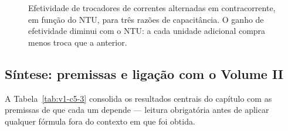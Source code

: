 \documentclass[12pt,a4paper]{article}
\numberwithin{equation}{section}
\numberwithin{table}{section}
\numberwithin{figure}{section}
\begin{document}
\begin{figure}[H]
\centering
{}
\caption[Efetividade de trocadores contracorrente em função do NTU.]{%
Efetividade de trocadores de correntes alternadas em contracorrente, em
função do NTU, para três razões de capacitância. O ganho de efetividade
diminui com o NTU: a cada unidade adicional compra menos troca que a
anterior.}
\label{fig:v1-c5-3}
\end{figure}

\subsection{Síntese: premissas e ligação com o Volume II}\label{sub:v1-c5-sintese}

A Tabela~\ref{tab:v1-c5-3} consolida os resultados centrais do capítulo com
as premissas de que cada um depende --- leitura obrigatória antes de aplicar
qualquer fórmula fora do contexto em que foi obtida.
\end{document}
